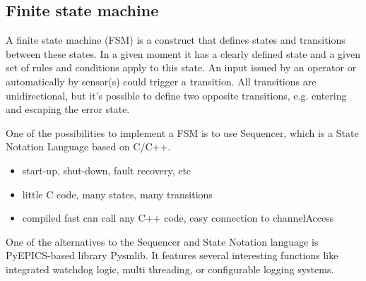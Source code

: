 \subsection{Finite state machine}
A finite state machine (\gls{FSM}) is a construct that defines states and transitions between these states. In a given moment it has a clearly defined state and a given set of rules and conditions apply to this state. An input issued by an operator or automatically by sensor(s) could trigger a transition. All transitions are unidirectional, but it's possible to define two opposite transitions, e.g. entering and escaping the error state. 

One of the possibilities to implement a \gls{FSM} is to use Sequencer, which is a State Notation Language based on C/C++. 
\begin{itemize}
    \item start-up, shut-down, fault recovery, etc
    \item little C code, many states, many transitions
    \item compiled fast can call any C++ code, easy connection to channelAccess 
\end{itemize}
One of the alternatives to the Sequencer and State Notation language is PyEPICS-based library Pysmlib. It features several interesting functions like integrated watchdog logic, multi threading, or configurable logging systems.


